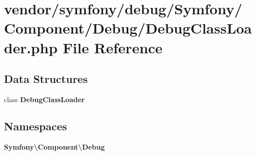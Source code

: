 \section{vendor/symfony/debug/\+Symfony/\+Component/\+Debug/\+Debug\+Class\+Loader.php File Reference}
\label{_debug_class_loader_8php}
\subsection*{Data Structures}
\begin{DoxyCompactItemize}
\item 
class {\bf Debug\+Class\+Loader}
\end{DoxyCompactItemize}
\subsection*{Namespaces}
\begin{DoxyCompactItemize}
\item 
 {\bf Symfony\textbackslash{}\+Component\textbackslash{}\+Debug}
\end{DoxyCompactItemize}
